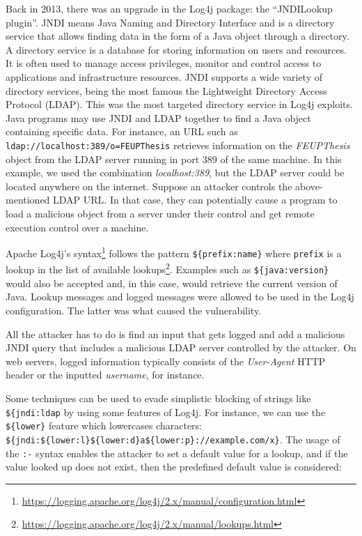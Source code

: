 Back in 2013, there was an upgrade in the Log4j package: the ``JNDILookup plugin''. JNDI means Java Naming and Directory Interface and is a directory service that allows finding data in the form of a Java object through a directory. A directory service is a database for storing information on users and resources. It is often used to manage access privileges, monitor and control access to applications and infrastructure resources. JNDI supports a wide variety of directory services, being the most famous the Lightweight Directory Access Protocol (LDAP). This was the most targeted directory service in Log4j exploits. Java programs may use JNDI and LDAP together to find a Java object containing specific data. For instance, an URL such as \texttt{ldap://localhost:389/o=FEUPThesis} retrieves information on the \textit{FEUPThesis} object from the LDAP server running in port 389 of the same machine. In this example, we used the combination \textit{localhost:389}, but the LDAP server could be located anywhere on the internet. Suppose an attacker controls the above-mentioned LDAP URL. In that case, they can potentially cause a program to load a malicious object from a server under their control and get remote execution control over a machine.

Apache Log4j's syntax\footnote{\url{https://logging.apache.org/log4j/2.x/manual/configuration.html}} follows the pattern \texttt{\$\{prefix:name\}} where \texttt{prefix} is a lookup in the list of available lookups\footnote{\url{https://logging.apache.org/log4j/2.x/manual/lookups.html}}. Examples such as \texttt{\$\{java:version\}} would also be accepted and, in this case, would retrieve the current version of Java. Lookup messages and logged messages were allowed to be used in the Log4j configuration. The latter was what caused the vulnerability.

All the attacker has to do is find an input that gets logged and add a malicious JNDI query that includes a malicious LDAP server controlled by the attacker. On web servers, logged information typically consists of the \textit{User-Agent} HTTP header or the inputted \textit{username}, for instance.

Some techniques can be used to evade simplistic blocking of strings like \texttt{\$\{jndi:ldap} by using some features of Log4j. For instance, we can use the \texttt{\$\{lower\}} feature which lowercases characters: \texttt{\$\{jndi:\$\{lower:l\}\$\{lower:d\}a\$\{lower:p\}://example.com/x\}}. The usage of the \texttt{:-} syntax enables the attacker to set a default value for a lookup, and if the value looked up does not exist, then the predefined default value is considered:

